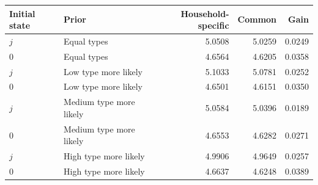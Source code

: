 \begin{tabular}{llrrr}\toprule
Initial state & Prior & Household-specific & Common & Gain\\\midrule
$j$ & Equal types & 5.0508 & 5.0259 & 0.0249 \\
$0$ & Equal types & 4.6564 & 4.6205 & 0.0358 \\
$j$ & Low type more likely & 5.1033 & 5.0781 & 0.0252 \\
$0$ & Low type more likely & 4.6501 & 4.6151 & 0.0350 \\
$j$ & Medium type more likely & 5.0584 & 5.0396 & 0.0189 \\
$0$ & Medium type more likely & 4.6553 & 4.6282 & 0.0271 \\
$j$ & High type more likely & 4.9906 & 4.9649 & 0.0257 \\
$0$ & High type more likely & 4.6637 & 4.6248 & 0.0389 \\
\bottomrule\end{tabular}
